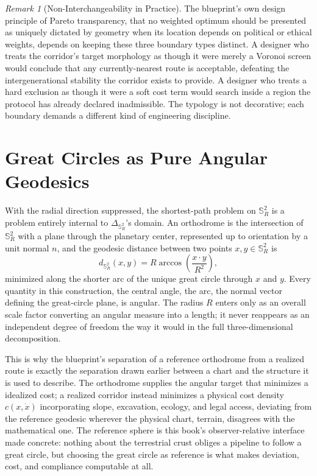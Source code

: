 \documentclass[11pt,fleqn]{book}
\numberwithin{equation}{chapter}
\theoremstyle{plain}
\theoremstyle{definition}
\theoremstyle{remark}
\newtheorem{remark}[theorem]{Remark}
\newcommand{\Sphere}{\mathbb{S}^{2}}
\begin{document}
\begin{remark}[Non-Interchangeability in Practice]
The blueprint's own design principle of Pareto transparency, that no weighted optimum should be presented as uniquely dictated by geometry when its location depends on political or ethical weights, depends on keeping these three boundary types distinct. A designer who treats the corridor's target morphology as though it were merely a Voronoi screen would conclude that any currently-nearest route is acceptable, defeating the intergenerational stability the corridor exists to provide. A designer who treats a hard exclusion as though it were a soft cost term would search inside a region the protocol has already declared inadmissible. The typology is not decorative; each boundary demands a different kind of engineering discipline.
\end{remark}

\section{Great Circles as Pure Angular Geodesics}

With the radial direction suppressed, the shortest-path problem on \(\Sphere_R\) is a problem entirely internal to \(\Delta_{\Sphere_R}\)'s domain. An orthodrome is the intersection of \(\Sphere_R\) with a plane through the planetary center, represented up to orientation by a unit normal \(n\), and the geodesic distance between two points \(x,y\in\Sphere_R\) is
\begin{equation}
d_{\Sphere_R}(x,y)=R\arccos\!\left(\frac{x\cdot y}{R^2}\right),
\end{equation}
minimized along the shorter arc of the unique great circle through \(x\) and \(y\). Every quantity in this construction, the central angle, the arc, the normal vector defining the great-circle plane, is angular. The radius \(R\) enters only as an overall scale factor converting an angular measure into a length; it never reappears as an independent degree of freedom the way it would in the full three-dimensional decomposition.

This is why the blueprint's separation of a reference orthodrome from a realized route is exactly the separation drawn earlier between a chart and the structure it is used to describe. The orthodrome supplies the angular target that minimizes a idealized cost; a realized corridor instead minimizes a physical cost density \(c(x,\dot x)\) incorporating slope, excavation, ecology, and legal access, deviating from the reference geodesic wherever the physical chart, terrain, disagrees with the mathematical one. The reference sphere is this book's observer-relative interface made concrete: nothing about the terrestrial crust obliges a pipeline to follow a great circle, but choosing the great circle as reference is what makes deviation, cost, and compliance computable at all.
\end{document}
